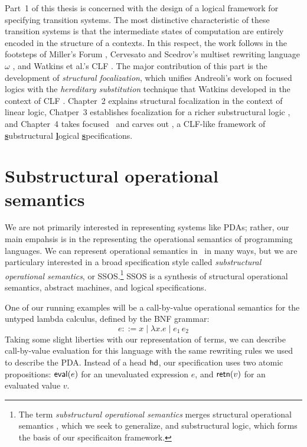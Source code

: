 Part~1 of this thesis is concerned with the design of a logical
framework for specifying transition systems. The most distinctive
characteristic of these transition systems is that the intermediate
states of computation are entirely encoded in the structure of a
contexts. In this respect, the work follows in the footsteps of
Miller's Forum \cite{miller96forum}, Cervesato and Scedrov's multiset
rewriting language $\omega$ \cite{cervesato09relating}, and Watkins et
al.'s CLF \cite{watkins02concurrent}. The major contribution of this
part is the development of {\it structural focalization}, which
unifies Andreoli's work on focused logics \cite{andreoli92logic} with
the {\it hereditary substitution} technique that Watkins developed in
the context of CLF \cite{watkins02concurrent}. Chapter~2 explains
structural focalization in the context of linear logic, Chatper~3
establishes focalization for a richer substructural logic \ollll, and
Chapter~4 takes focused \ollll~and carves out \sls, a CLF-like
framework of \underline{\bf s}ubstructural \underline{\bf l}ogical
\underline{\bf s}pecifications.

\section{Substructural operational semantics}
\label{sec:intro-ssos}

We are not primarily interested in representing systems like PDAs;
rather, our main empahsis is in the representing the operational
semantics of programming languages. We can represent operational
semantics in \sls~in many ways, but we are particulary interested in a
broad specification style called {\it substructural operational
  semantics}, or SSOS.\footnote{The term {\it substructural
    operational semantics} merges structural operational semantics
  \cite{plotkin04structural}, which we seek to generalize, and
  substructural logic, which forms the basis of our specificaiton
  framework.} SSOS is a synthesis of structural operational semantics,
abstract machines, and logical specifications.

One of our running
examples will be a call-by-value operational semantics for the untyped
lambda calculus, defined by the BNF grammar:
\[
e ::= x \mid \lambda x.e \mid e_1\,e_2
\]
Taking some slight liberties with our representation of terms, we can
describe call-by-value evaluation for this language with the same
rewriting rules we used to describe the PDA. Instead of a head ${\sf
  hd}$, our specification uses two atomic propositions: ${\sf
  eval}(e)$ for an unevaluated expression $e$, and ${\sf retn}(v)$
for an evaluated value $v$.


